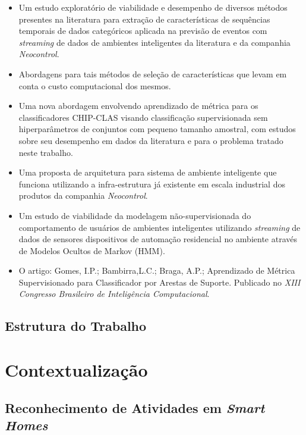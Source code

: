 \documentclass[
	12pt,				%
	openright,			%
	twoside,			%
	a4paper,			%
	english,			%
	spanish,			%
	brazil,				%
	]{abntex2}\usepackage[]{graphicx}\usepackage[]{color}
\begin{document}
\begin{itemize}
	\item Um estudo exploratório de viabilidade e desempenho de diversos métodos presentes na literatura para extração de características de sequências temporais de dados categóricos aplicada na previsão de eventos com \textit{streaming} de dados de ambientes inteligentes da literatura e da companhia \textit{Neocontrol}.
	\item Abordagens para tais métodos de seleção de características que levam em conta o custo computacional dos mesmos.
	\item Uma nova abordagem envolvendo aprendizado de métrica para os classificadores CHIP-CLAS visando classificação supervisionada sem hiperparâmetros de conjuntos com pequeno tamanho amostral, com estudos sobre seu desempenho em dados da literatura e para o problema tratado neste trabalho.
	\item Uma proposta de arquitetura para sistema de ambiente inteligente que funciona utilizando a infra-estrutura já existente em escala industrial dos produtos da companhia \textit{Neocontrol}.
	\item Um estudo de viabilidade da modelagem não-supervisionada do comportamento de usuários de ambientes inteligentes utilizando \textit{streaming} de dados de sensores dispositivos de automação residencial no ambiente através de Modelos Ocultos de Markov (HMM).
	\item O artigo: Gomes, I.P.; Bambirra,L.C.; Braga, A.P.; Aprendizado de Métrica Supervisionado para Classificador por Arestas de Suporte. Publicado no \textit{XIII Congresso Brasileiro de Inteligência Computacional}.
\end{itemize}

\section{Estrutura do Trabalho}





\chapter{Contextualização}

\section{Reconhecimento de Atividades em \textit{Smart Homes}}
\end{document}
